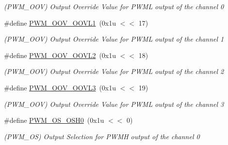\begin{DoxyCompactItemize}
\begin{DoxyCompactList}\small\item\em (P\+W\+M\+\_\+\+O\+OV) Output Override Value for P\+W\+ML output of the channel 0 \end{DoxyCompactList}\item 
\mbox{\label{group__SAMV71__PWM_ga7fde71f06f7907e95816dc62b79a48e6}} 
\#define \mbox{\hyperlink{group__SAMV71__PWM_ga7fde71f06f7907e95816dc62b79a48e6}{P\+W\+M\+\_\+\+O\+O\+V\+\_\+\+O\+O\+V\+L1}}~(0x1u $<$$<$ 17)
\begin{DoxyCompactList}\small\item\em (P\+W\+M\+\_\+\+O\+OV) Output Override Value for P\+W\+ML output of the channel 1 \end{DoxyCompactList}\item 
\mbox{\label{group__SAMV71__PWM_gae96833b545645028bb8085ee770f712b}} 
\#define \mbox{\hyperlink{group__SAMV71__PWM_gae96833b545645028bb8085ee770f712b}{P\+W\+M\+\_\+\+O\+O\+V\+\_\+\+O\+O\+V\+L2}}~(0x1u $<$$<$ 18)
\begin{DoxyCompactList}\small\item\em (P\+W\+M\+\_\+\+O\+OV) Output Override Value for P\+W\+ML output of the channel 2 \end{DoxyCompactList}\item 
\mbox{\label{group__SAMV71__PWM_ga0f9f80a389f9b126dddbe088c413c859}} 
\#define \mbox{\hyperlink{group__SAMV71__PWM_ga0f9f80a389f9b126dddbe088c413c859}{P\+W\+M\+\_\+\+O\+O\+V\+\_\+\+O\+O\+V\+L3}}~(0x1u $<$$<$ 19)
\begin{DoxyCompactList}\small\item\em (P\+W\+M\+\_\+\+O\+OV) Output Override Value for P\+W\+ML output of the channel 3 \end{DoxyCompactList}\item 
\mbox{\label{group__SAMV71__PWM_ga25f8b6e5987a53e6f03c4a28b00fd809}} 
\#define \mbox{\hyperlink{group__SAMV71__PWM_ga25f8b6e5987a53e6f03c4a28b00fd809}{P\+W\+M\+\_\+\+O\+S\+\_\+\+O\+S\+H0}}~(0x1u $<$$<$ 0)
\begin{DoxyCompactList}\small\item\em (P\+W\+M\+\_\+\+OS) Output Selection for P\+W\+MH output of the channel 0 \end{DoxyCompactList}\item 

\end{DoxyCompactItemize}
